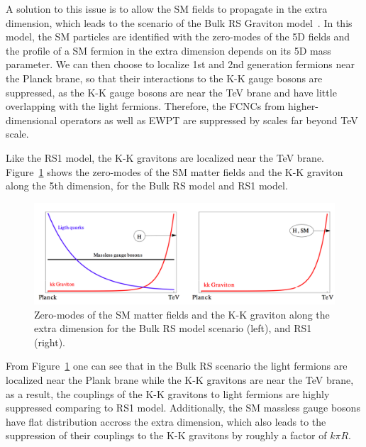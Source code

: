 \vspace{0.3cm}
A solution to this issue is to allow the SM fields to propagate in the extra dimension, which leads to the scenario of the Bulk RS Graviton model~\cite{intro_bulkref1,intro_bulkref2,intro_bulkref3}. In this model, the SM particles are identified with the zero-modes of the 5D fields and the profile of a SM fermion in the extra dimension depends on its 5D mass parameter. We can then choose to localize 1st and 2nd generation fermions near the Planck brane, so that their interactions to the K-K gauge bosons are suppressed, as the K-K gauge bosons are near the TeV brane and have little overlapping with the light fermions. Therefore,  the FCNCs from higher-dimensional operators as well as EWPT are suppressed by scales far beyond TeV scale.

\vspace{0.3cm}
Like the RS1 model, the K-K gravitons are localized near the TeV brane. Figure~\ref{fig:intro_rsandbulk} shows the zero-modes of the SM matter fields and the K-K graviton along the 5th dimension, for the Bulk RS model and RS1 model.
\begin{figure}[htbp]
\begin{center}
\includegraphics[width=0.9\linewidth]{figures/intro_rsandbulk.png}
\caption{Zero-modes of the SM matter fields and the K-K graviton along the extra dimension for the Bulk RS model scenario (left), and RS1 (right).}
\label{fig:intro_rsandbulk}
\end{center}
\end{figure}

From Figure~\ref{fig:intro_rsandbulk} one can see that in the Bulk RS scenario the light fermions are localized near the Plank brane while the K-K gravitons are near the TeV brane, as a result, the couplings of the K-K gravitons to light fermions are highly suppressed comparing to RS1 model. Additionally, the SM massless gauge bosons have flat distribution accross the extra dimension, which also leads to the suppression of their couplings to the K-K gravitons by roughly a factor of $k\pi R$.

